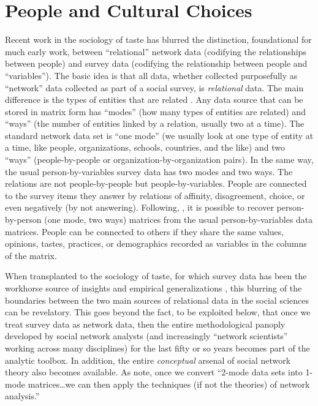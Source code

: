 \documentclass[a4paper,12pt]{extarticle}
\begin{document}
\section{People and Cultural Choices}
Recent work in the sociology of taste has blurred the distinction, foundational for much early work, between ``relational'' network data (codifying the relationships between people) and survey data (codifying the relationship between people and ``variables''). The basic idea is that all data, whether collected purposefully as ``network'' data collected as part of a social survey, is \textit{relational} data. The main difference is the types of entities that are related \citep{borgatti_everett97}. Any data source that can be stored in matrix form has ``modes'' (how many types of entities are related) and ``ways'' (the number of entities linked by a relation, usually two at a time). The standard network data set is ``one mode'' (we usually look at one type of entity at a time, like people, organizations, schools, countries, and the like) and two ``ways'' (people-by-people or organization-by-organization pairs). In the same way, the usual person-by-variables survey data has two modes and two ways. The relations are not people-by-people but people-by-variables. People are connected to the survey items they answer by relations of affinity, disagreement, choice, or even negatively (by not answering). Following, \citet{breiger74}, it is possible to recover person-by-person (one mode, two ways) matrices from the usual person-by-variables data matrices. People can be connected to others if they share the same values, opinions, tastes, practices, or demographics recorded as variables in the columns of the matrix. 

When transplanted to the sociology of taste, for which survey data has been the workhorse source of insights and empirical generalizations \citep{peterson_kern96, bryson96, vaneijck01,savage_gayo11}, this blurring of the boundaries between the two main sources of relational data in the social sciences can be revelatory. This goes beyond the fact, to be exploited below, that once we treat survey data as network data, then the entire methodological panoply developed by social network analysts (and increasingly ``network scientists'' working across many disciplines) for the last fifty or so years becomes part of the analytic toolbox. In addition, the entire \textit{conceptual} arsenal of social network theory \citep{borgatti11} also becomes available. As \citet[244]{borgatti_everett97} note, once we convert ``2-mode data sets into 1-mode matrices{\dots}we can then apply the techniques (if not the theories) of network analysis.''
\end{document}
